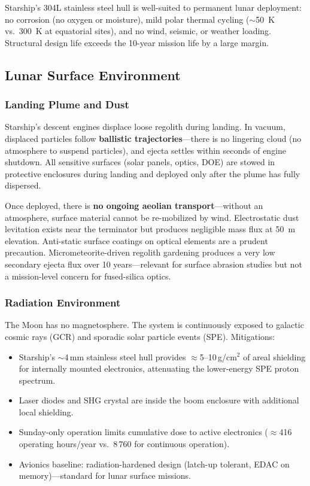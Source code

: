 \documentclass[12pt,letterpaper]{article}
\begin{document}
Starship's 304L stainless steel hull is well-suited to permanent lunar
deployment: no corrosion (no oxygen or moisture), mild polar thermal cycling
($\sim$\SI{50}{\kelvin} vs.\ \SI{300}{\kelvin} at equatorial sites), and no
wind, seismic, or weather loading. Structural design life exceeds the
10-year mission life by a large margin.

\subsection{Lunar Surface Environment}

\subsubsection*{Landing Plume and Dust}

Starship's descent engines displace loose regolith during landing. In
vacuum, displaced particles follow \textbf{ballistic trajectories}---there is
no lingering cloud (no atmosphere to suspend particles), and ejecta settles
within seconds of engine shutdown. All sensitive surfaces (solar panels,
optics, DOE) are stowed in protective enclosures during landing and deployed
only after the plume has fully dispersed.

Once deployed, there is \textbf{no ongoing aeolian transport}---without an
atmosphere, surface material cannot be re-mobilized by wind. Electrostatic
dust levitation exists near the terminator but produces negligible mass flux
at \SI{50}{\meter} elevation. Anti-static surface coatings on optical
elements are a prudent precaution. Micrometeorite-driven regolith gardening
produces a very low secondary ejecta flux over 10 years---relevant for
surface abrasion studies but not a mission-level concern for fused-silica
optics.

\subsubsection*{Radiation Environment}

The Moon has no magnetosphere. The system is continuously exposed to galactic
cosmic rays (GCR) and sporadic solar particle events (SPE). Mitigations:

\begin{itemize}[leftmargin=1.5em]
  \item Starship's $\sim$4\,mm stainless steel hull provides $\approx$5--10\,g/cm$^2$
        of areal shielding for internally mounted electronics, attenuating
        the lower-energy SPE proton spectrum.
  \item Laser diodes and SHG crystal are inside the boom enclosure with
        additional local shielding.
  \item Sunday-only operation limits cumulative dose to active electronics
        ($\approx$416 operating hours/year vs.\ 8\,760 for continuous
        operation).
  \item Avionics baseline: radiation-hardened design (latch-up tolerant,
        EDAC on memory)---standard for lunar surface missions.
\end{itemize}
\end{document}
